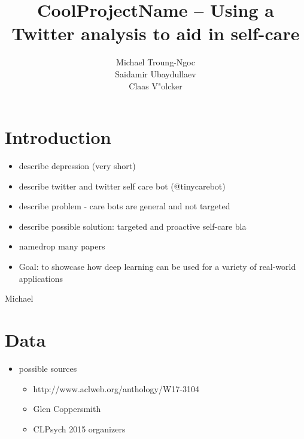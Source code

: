\documentclass[colorback,accentcolor=tud9c]{tudreport}
\title{CoolProjectName -- Using a Twitter analysis to aid in self-care}
\subtitle{Michael Troung-Ngoc\\Saidamir Ubaydullaev\\Claas V"olcker}
\begin{document}
\maketitle


\section*{Introduction}

\begin{itemize}
    \item describe depression (very short)
    \item describe twitter and twitter self care bot (@tinycarebot)
    \item describe problem - care bots are general and not targeted
    \item describe possible solution: targeted and proactive self-care bla
    \item namedrop many papers
    \item Goal: to showcase how deep learning can be used for a variety of real-world applications
\end{itemize}

Michael


\section*{Data}
\begin{itemize}
    \item possible sources
    \begin{itemize}
        \item http://www.aclweb.org/anthology/W17-3104
    \item Glen Coppersmith
    \item CLPsych 2015 organizers
    \end{itemize}
\end{itemize}
\end{document}
